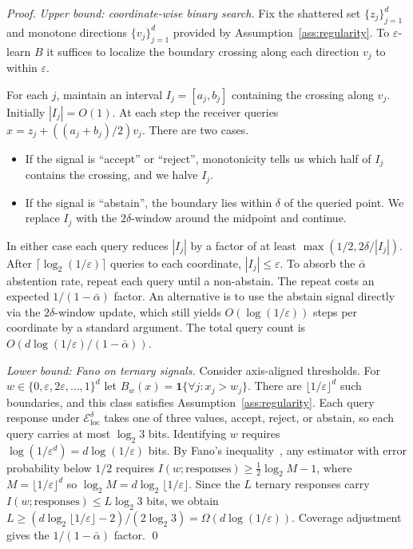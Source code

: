 \documentclass[runningheads,envcountsame]{llncs}
\newcommand{\cE}{\mathcal{E}}
\newcommand{\ind}{\mathbf{1}}
\newcommand{\eps}{\varepsilon}
\begin{document}
\begin{proof}
\emph{Upper bound: coordinate-wise binary search.} Fix the shattered set $\{z_j\}_{j=1}^d$ and monotone directions $\{v_j\}_{j=1}^d$ provided by Assumption~\ref{ass:regularity}. To $\eps$-learn $B$ it suffices to localize the boundary crossing along each direction $v_j$ to within $\eps$.

For each $j$, maintain an interval $I_j = [a_j, b_j]$ containing the crossing along $v_j$. Initially $|I_j| = O(1)$. At each step the receiver queries $x = z_j + ((a_j+b_j)/2) v_j$. There are two cases.
\begin{itemize}[nosep]
\item If the signal is ``accept'' or ``reject'', monotonicity tells us which half of $I_j$ contains the crossing, and we halve $I_j$.
\item If the signal is ``abstain'', the boundary lies within $\delta$ of the queried point. We replace $I_j$ with the $2\delta$-window around the midpoint and continue.
\end{itemize}
In either case each query reduces $|I_j|$ by a factor of at least $\max(1/2, 2\delta/|I_j|)$. After $\lceil \log_2(1/\eps) \rceil$ queries to each coordinate, $|I_j| \leq \eps$. To absorb the $\bar\alpha$ abstention rate, repeat each query until a non-abstain. The repeat costs an expected $1/(1-\bar\alpha)$ factor. An alternative is to use the abstain signal directly via the $2\delta$-window update, which still yields $O(\log(1/\eps))$ steps per coordinate by a standard argument. The total query count is $O(d \log(1/\eps) / (1-\bar\alpha))$.

\emph{Lower bound: Fano on ternary signals.} Consider axis-aligned thresholds. For $w \in \{0, \eps, 2\eps, \ldots, 1\}^d$ let $B_w(x) = \ind\{\forall j: x_j > w_j\}$. There are $\lfloor 1/\eps \rfloor^d$ such boundaries, and this class satisfies Assumption~\ref{ass:regularity}. Each query response under $\cE_{\mathrm{loc}}^\delta$ takes one of three values, accept, reject, or abstain, so each query carries at most $\log_2 3$ bits. Identifying $w$ requires $\log(1/\eps^d) = d \log(1/\eps)$ bits. By Fano's inequality~\cite{cover2006elements}, any estimator with error probability below $1/2$ requires $I(w; \text{responses}) \geq \tfrac{1}{2}\log_2 M - 1$, where $M = \lfloor 1/\eps\rfloor^d$ so $\log_2 M = d\log_2\lfloor 1/\eps\rfloor$. Since the $L$ ternary responses carry $I(w; \text{responses}) \leq L \log_2 3$ bits, we obtain $L \geq (d \log_2\lfloor 1/\eps\rfloor - 2)/(2\log_2 3) = \Omega(d \log(1/\eps))$. Coverage adjustment gives the $1/(1-\bar\alpha)$ factor. \qed
\end{proof}
\end{document}

